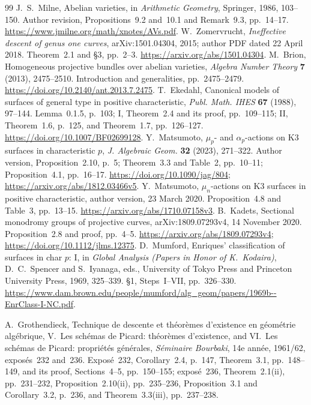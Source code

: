\documentclass[11pt]{article}
\theoremstyle{remark}\newtheorem{remark}[theorem]{Remark}
\begin{document}
\begin{thebibliography}{99}
 J.~S.~Milne, Abelian varieties, in \emph{Arithmetic Geometry}, Springer, 1986, 103--150. Author revision, Propositions~9.2 and~10.1 and Remark~9.3, pp.~14--17. \url{https://www.jmilne.org/math/xnotes/AVs.pdf}.
 W.~Zomervrucht, \emph{Ineffective descent of genus one curves}, arXiv:1501.04304, 2015; author PDF dated 22 April 2018. Theorem~2.1 and \S3, pp.~2--3. \url{https://arxiv.org/abs/1501.04304}.
 M.~Brion, Homogeneous projective bundles over abelian varieties, \emph{Algebra Number Theory} \textbf{7} (2013), 2475--2510. Introduction and generalities, pp.~2475--2479. \url{https://doi.org/10.2140/ant.2013.7.2475}.
 T.~Ekedahl, Canonical models of surfaces of general type in positive characteristic, \emph{Publ. Math. IHES} \textbf{67} (1988), 97--144. Lemma~0.1.5, p.~103; I, Theorem~2.4 and its proof, pp.~109--115; II, Theorem~1.6, p.~125, and Theorem~1.7, pp.~126--127. \url{https://doi.org/10.1007/BF02699128}.
 Y.~Matsumoto, $\mu_p$- and $\alpha_p$-actions on K3 surfaces in characteristic $p$, \emph{J. Algebraic Geom.} \textbf{32} (2023), 271--322. Author version, Proposition~2.10, p.~5; Theorem~3.3 and Table~2, pp.~10--11; Proposition~4.1, pp.~16--17. \url{https://doi.org/10.1090/jag/804}; \url{https://arxiv.org/abs/1812.03466v5}.
 Y.~Matsumoto, $\mu_n$-actions on K3 surfaces in positive characteristic, author version, 23 March 2020. Proposition~4.8 and Table~3, pp.~13--15. \url{https://arxiv.org/abs/1710.07158v3}.
 B.~Kadets, Sectional monodromy groups of projective curves, arXiv:1809.07293v4, 14 November 2020. Proposition~2.8 and proof, pp.~4--5. \url{https://arxiv.org/abs/1809.07293v4}; \url{https://doi.org/10.1112/jlms.12375}.
D.~Mumford, Enriques' classification of surfaces in char $p$: I,
in \emph{Global Analysis (Papers in Honor of K.~Kodaira)},
D.~C.~Spencer and S.~Iyanaga, eds.,
University of Tokyo Press and Princeton University Press, 1969,
325--339. \S1, Steps~I--VII, pp.~326--330.
\url{https://www.dam.brown.edu/people/mumford/alg_geom/papers/1969b--EnrClass-I-NC.pdf}.

A.~Grothendieck, Technique de descente et th\'eor\`emes d'existence
en g\'eom\'etrie alg\'ebrique,
V.~Les sch\'emas de Picard: th\'eor\`emes d'existence,
and VI.~Les sch\'emas de Picard: propri\'et\'es g\'en\'erales,
\emph{S\'eminaire Bourbaki}, 14e ann\'ee, 1961/62,
expos\'es~232 and~236.
Expos\'e~232, Corollary~2.4, p.~147, Theorem~3.1, pp.~148--149,
and its proof,
Sections~4--5, pp.~150--155;
expos\'e~236, Theorem~2.1(ii), pp.~231--232,
Proposition~2.10(ii), pp.~235--236,
Proposition~3.1 and Corollary~3.2, p.~236, and
Theorem~3.3(iii), pp.~237--238.


\end{thebibliography}
\end{document}
